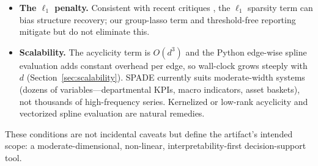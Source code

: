 \begin{itemize}
    against NoGAM the result is mixed (ahead at $d{=}6,20$, behind at $d{=}10$),
    though still at a fraction of NoGAM's compute throughout
    (Section~\ref{sec:instdag}). When \emph{only} a structure estimate is needed
    and interpretability of mechanisms is not required, a fast classical method
    may still suffice on \emph{lagged} structure, where PCMCI and VAR-LiNGAM keep
    the edge; SPADE's advantage is delivering competitive structure recovery
    \emph{together} with interpretable edge shapes and a coupled forecaster.
    \item \textbf{The $\ell_1$ penalty.} Consistent with recent critiques
    \citep{ng2020golem,Bello2022}, the $\ell_1$ sparsity term can bias structure
    recovery; our group-lasso term and threshold-free reporting mitigate but do
    not eliminate this.
    \item \textbf{Scalability.} The acyclicity term is $O(d^3)$ and the Python
    edge-wise spline evaluation adds constant overhead per edge, so wall-clock
    grows steeply with $d$ (Section~\ref{sec:scalability}). SPADE currently
    suits moderate-width systems (dozens of variables---departmental KPIs,
    macro indicators, asset baskets), not thousands of high-frequency series.
    Kernelized or low-rank acyclicity and vectorized spline evaluation are
    natural remedies.
\end{itemize}
These conditions are not incidental caveats but define the artifact's intended
scope: a moderate-dimensional, non-linear, interpretability-first decision-support
tool.
